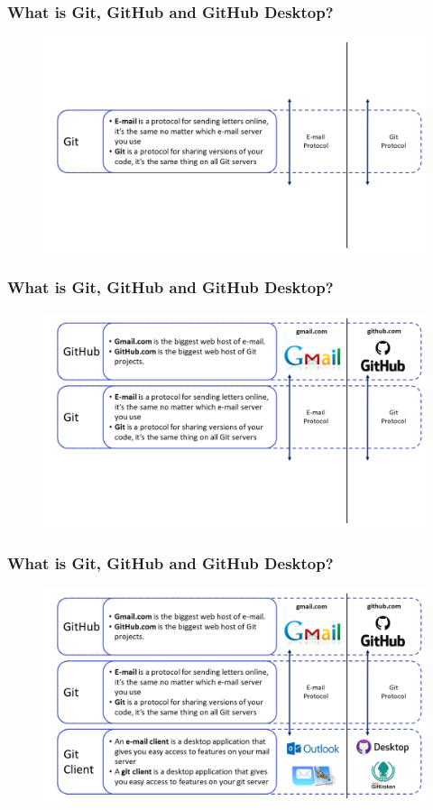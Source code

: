 \begin{frame}
	\frametitle{What is Git, GitHub and GitHub Desktop?}
	\begin{figure}
		\centering
		\includegraphics[width=0.7\linewidth]{../../Common-Resources/img/git_github_gitclient_git}
		\label{fig:gitgithubgitclient_git}
	\end{figure}
\end{frame}

\begin{frame}
	\frametitle{What is Git, GitHub and GitHub Desktop?}
	\begin{figure}
		\centering
		\includegraphics[width=0.7\linewidth]{../../Common-Resources/img/git_github_gitclient_github}
		\label{fig:gitgithubgitclient_github}
	\end{figure}
\end{frame}

\begin{frame}
	\frametitle{What is Git, GitHub and GitHub Desktop?}
	\begin{figure}
		\centering
		\includegraphics[width=0.7\linewidth]{../../Common-Resources/img/git_github_gitclient_gitclient}
		\label{fig:gitgithubgitclient_gitclient}
	\end{figure}
\end{frame}